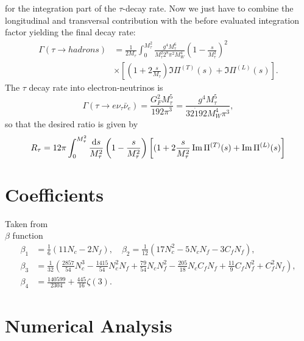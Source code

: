 for the integration part of the $\tau$-decay rate. Now we just have to combine the longitudinal and transversal contribution with the before evaluated integration factor yielding the final decay rate:
\begin{equation}
	\begin{split}
		\Gamma(\tau\to hadrons) &= \frac{1}{2 M_\tau} \int_0^{M_\tau^2} \frac{g^4 M_\tau^6}{M_\tau^2 2^8 \pi^2 M_W^4} \left(1-\frac{s}{M_\tau^2}\right)^2 \\
		& \times \left[ \left(1 + 2 \frac{s}{M_\tau}\right) \Im \Pi^{(T)}(s) + \Im \Pi^{(L)}(s) \right].
	\end{split}
\end{equation}
The $\tau$ decay rate into electron-neutrinos is
\begin{equation}
	\Gamma(\tau\to e \nu_\tau \bar \nu_e ) = \frac{G_F^2 M_\tau^5}{192 \pi^3} = \frac{g^4 M_\tau^5}{32 \dot 192 M_W^4 \pi^3},
\end{equation}
so that the desired ratio is given by
\begin{equation}
		R_\tau = 12 \pi \int_0^{M_\tau^2} \frac{\mathop{}\!\mathrm{d} s}{M_\tau^2} \left(1-\frac{s}{M_\tau^2}\right) \left[(1+2 \frac{s}		{M_\tau^2}\Im \Pi^{(T)}(s) + \Im\Pi^{(L)}(s) \right]
\end{equation}	


\section{Coefficients}
\label{app:coefficients}
Taken from \cite{DiogoPHD} \\
$\beta$ function
\begin{equation}
	\begin{split}
		\beta_1 &= \frac{1}{6} (11 N_c - 2 N_f), \quad \beta_2 = \frac{1}{12} ( 17 N_c^2 - 5 N_c N_f - 3 C_f N_f), \\
		\beta_3 &= \frac{1}{32} \left(\frac{2857}{54} N_c^3 - \frac{1415}{54} N_c^2 N_f + \frac{79}{54} N_c N_f^2 - \frac{205}{18} N_c C_f N_f + \frac{11}{9} C_f N_f^2 + C_f^2 N_f \right), \\
		\beta_4 &= \frac{140599}{2304} + \frac{445}{16}\zeta(3).
	\end{split}
\end{equation}	

		
		
\section{Numerical Analysis}
\cite{Chapra2010} \cite{Press2007}
